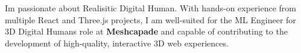 \begin{onecolentry}
    I\textquotesingle m passionate about Realisitic Digital Human. With hands-on experience from multiple React and Three.js projects, I am well-suited for the ML Engineer for 3D Digital Humans role at \textbf{Meshcapade} and capable of contributing to the development of high-quality, interactive 3D web experiences.
\end{onecolentry}